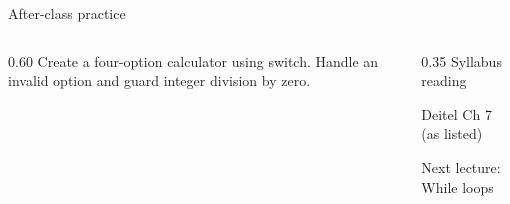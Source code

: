 \documentclass[10pt,aspectratio=169]{beamer}
\begin{document}
\begin{frame}[fragile,t]{After-class practice}
\begin{columns}[T,onlytextwidth]\begin{column}{0.60\textwidth}
Create a four-option calculator using switch. Handle an invalid option and guard integer division by zero.
\end{column}\begin{column}{0.35\textwidth}\small
Syllabus reading\par Deitel Ch 7 (as listed)

Next lecture: While loops
\end{column}\end{columns}
\end{frame}
\end{document}

